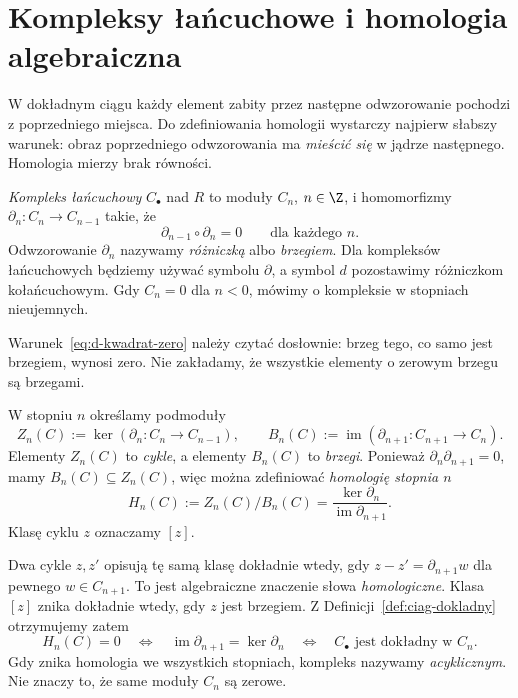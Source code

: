 \section{Kompleksy łańcuchowe i homologia algebraiczna}
\label{sec:kompleks-homologia}

W dokładnym ciągu każdy element zabity przez
następne odwzorowanie pochodzi z poprzedniego miejsca.
Do zdefiniowania homologii wystarczy najpierw
słabszy warunek: obraz poprzedniego odwzorowania ma
\emph{mieścić się} w jądrze następnego.
Homologia mierzy brak równości.

\begin{definicja}
\label{def:kompleks-lancuchowy}
\emph{Kompleks łańcuchowy} $C_\bullet$ nad $R$
to moduły $C_n$, $n\in\Z$, i homomorfizmy
$\partial_n:C_n\to C_{n-1}$ takie, że
\begin{equation}\label{eq:d-kwadrat-zero}
 \partial_{n-1}\circ \partial_n=0\qquad\text{dla każdego }n.
\end{equation}
Odwzorowanie $\partial_n$ nazywamy \emph{różniczką} albo
\emph{brzegiem}. Dla kompleksów łańcuchowych
będziemy używać symbolu $\partial$, a symbol $d$
pozostawimy różniczkom kołańcuchowym.
Gdy $C_n=0$ dla $n<0$,
mówimy o kompleksie w stopniach nieujemnych.
\end{definicja}

Warunek~\eqref{eq:d-kwadrat-zero} należy czytać
dosłownie: brzeg tego, co samo jest brzegiem,
wynosi zero. Nie zakładamy, że wszystkie
elementy o zerowym brzegu są brzegami.

\begin{definicja}
\label{def:homologia-algebraiczna}
W stopniu $n$ określamy podmoduły
\[
 Z_n(C):=\ker(\partial_n:C_n\to C_{n-1}),\qquad
 B_n(C):=\operatorname{im}(\partial_{n+1}:C_{n+1}\to C_n).
\]
Elementy $Z_n(C)$ to \emph{cykle}, a elementy
$B_n(C)$ to \emph{brzegi}. Ponieważ
$\partial_n\partial_{n+1}=0$, mamy $B_n(C)\subseteq Z_n(C)$,
więc można zdefiniować \emph{homologię stopnia $n$}
\begin{equation}\label{eq:homologia-def}
 H_n(C):=Z_n(C)/B_n(C)
 =\frac{\ker \partial_n}{\operatorname{im}\partial_{n+1}}.
\end{equation}
Klasę cyklu $z$ oznaczamy $[z]$.
\end{definicja}

Dwa cykle $z,z'$ opisują tę samą klasę dokładnie
wtedy, gdy $z-z'=\partial_{n+1}w$ dla pewnego
$w\in C_{n+1}$. To jest algebraiczne
znaczenie słowa \emph{homologiczne}.
Klasa $[z]$ znika dokładnie wtedy, gdy
$z$ jest brzegiem. Z Definicji~\ref{def:ciag-dokladny}
otrzymujemy zatem
\[
 H_n(C)=0
 \quad\Longleftrightarrow\quad
 \operatorname{im}\partial_{n+1}=\ker \partial_n
 \quad\Longleftrightarrow\quad
 C_\bullet\text{ jest dokładny w }C_n.
\]
Gdy znika homologia we wszystkich stopniach,
kompleks nazywamy \emph{acyklicznym}.
Nie znaczy to, że same moduły $C_n$ są zerowe.

